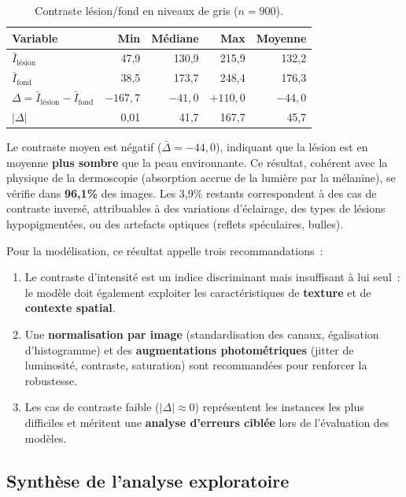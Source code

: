 \documentclass[12pt,a4paper]{article}
\begin{document}
\begin{table}[H]
\centering
\caption{Contraste lésion/fond en niveaux de gris ($n = 900$).}
\label{tab:contraste}
\begin{tabular}{l r r r r}
\toprule
\textbf{Variable} & \textbf{Min} & \textbf{Médiane} & \textbf{Max} & \textbf{Moyenne} \\
\midrule
$\bar{I}_{\text{lésion}}$ & 47,9 & 130,9 & 215,9 & 132,2 \\
$\bar{I}_{\text{fond}}$ & 38,5 & 173,7 & 248,4 & 176,3 \\
$\Delta = \bar{I}_{\text{lésion}} - \bar{I}_{\text{fond}}$ & $-167{,}7$ & $-41{,}0$ & $+110{,}0$ & $-44{,}0$ \\
$|\Delta|$ & 0,01 & 41,7 & 167,7 & 45,7 \\
\bottomrule
\end{tabular}
\end{table}

Le contraste moyen est négatif ($\bar{\Delta} = -44{,}0$), indiquant que la lésion est en moyenne \textbf{plus sombre} que la peau environnante. Ce résultat, cohérent avec la physique de la dermoscopie (absorption accrue de la lumière par la mélanine), se vérifie dans \textbf{96,1\%} des images. Les 3,9\% restants correspondent à des cas de contraste inversé, attribuables à des variations d'éclairage, des types de lésions hypopigmentées, ou des artefacts optiques (reflets spéculaires, bulles).

Pour la modélisation, ce résultat appelle trois recommandations~:
\begin{enumerate}[nosep]
    \item Le contraste d'intensité est un indice discriminant mais insuffisant à lui seul~: le modèle doit également exploiter les caractéristiques de \textbf{texture} et de \textbf{contexte spatial}.
    \item Une \textbf{normalisation par image} (standardisation des canaux, égalisation d'histogramme) et des \textbf{augmentations photométriques} (jitter de luminosité, contraste, saturation) sont recommandées pour renforcer la robustesse.
    \item Les cas de contraste faible ($|\Delta| \approx 0$) représentent les instances les plus difficiles et méritent une \textbf{analyse d'erreurs ciblée} lors de l'évaluation des modèles.
\end{enumerate}

\subsection{Synthèse de l'analyse exploratoire}
\end{document}
